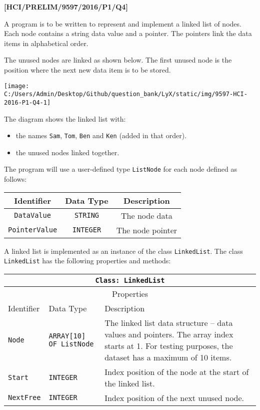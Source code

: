 \item \textbf{{[}HCI/PRELIM/9597/2016/P1/Q4{]} }

A program is to be written to represent and implement a linked list
of nodes. Each node contains a string data value and a pointer. The
pointers link the data items in alphabetical order. 

The unused nodes are linked as shown below. The first unused node
is the position where the next new data item is to be stored. 
\begin{center}
\texttt{[image: C:/Users/Admin/Desktop/Github/question\_bank/LyX/static/img/9597-HCI-2016-P1-Q4-1]}
\par\end{center}

The diagram shows the linked list with:
\begin{itemize}
\item the names \texttt{Sam}, \texttt{Tom}, \texttt{Ben} and \texttt{Ken}
(added in that order). 
\item the unused nodes linked together. 
\end{itemize}
The program will use a user-defined type \texttt{ListNode} for each
node defined as follows:
\noindent \begin{center}
\begin{tabular}{|c|c|c|}
\hline 
Identifier & Data Type & Description\tabularnewline
\hline 
\texttt{DataValue} & \texttt{STRING} & The node data\tabularnewline
\hline 
\texttt{PointerValue} & \texttt{INTEGER} & The node pointer \tabularnewline
\hline 
\end{tabular}
\par\end{center}

A linked list is implemented as an instance of the class \texttt{LinkedList}.
The class \texttt{LinkedList} has the following properties and methods:
\begin{center}
\begin{tabular}{|l|l|l|}
\hline 
\multicolumn{3}{|c|}{\texttt{Class: LinkedList}}\tabularnewline
\hline 
\multicolumn{3}{|c|}{Properties}\tabularnewline
\hline 
\texttt{\hspace{0.01\columnwidth}}Identifier & \texttt{\hspace{0.01\columnwidth}}Data Type & \texttt{\hspace{0.05\columnwidth}}Description\tabularnewline
\hline 
\texttt{Node} & \texttt{ARRAY{[}10{]} OF ListNode} & The linked list data structure -- data values and pointers. The array
index starts at 1. For testing purposes, the dataset has a maximum
of 10 items.\tabularnewline
\hline 
\texttt{Start} & \texttt{INTEGER} & Index position of the node at the start of the linked list. \tabularnewline
\hline 
\texttt{NextFree} & \texttt{INTEGER} & Index position of the next unused node.\tabularnewline
\hline 
\end{tabular}
\par\end{center}

